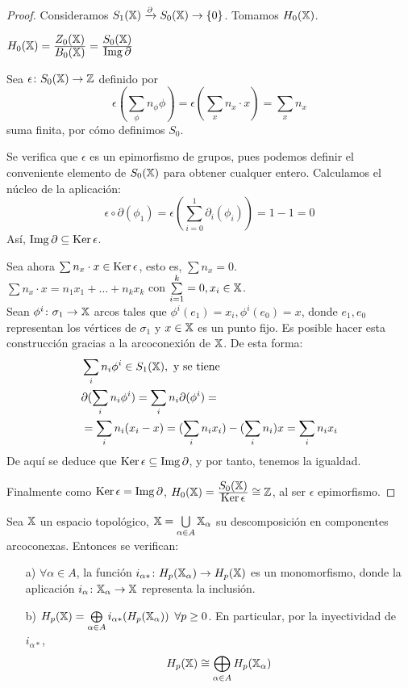 \begin{proof}
  Consideramos $S_{1}({\mathbb X}) \xrightarrow{\partial} S_{0}({\mathbb X}) \to \{0\}$. Tomamos $H_0({\mathbb X})$.

  $H_0({\mathbb X}) = \frac{\displaystyle Z_0({\mathbb X})}{\displaystyle B_0({\mathbb X})} = \frac{\displaystyle S_0({\mathbb X})}{\displaystyle \operatorname{Img} \partial}$

  Sea $\epsilon \colon S_0({\mathbb X}) \to \mathbb{Z}$ definido por \[\epsilon(\sum\limits_{\phi} n_\phi \phi) = \epsilon(\sum\limits_{x} n_x \cdot x) = \sum\limits_{x} n_x \]
  suma finita, por cómo definimos $S_0$.

  Se verifica que $\epsilon$ es un epimorfismo de grupos, pues podemos definir el conveniente elemento de $S_0({\mathbb X})$ para obtener
  cualquer entero. Calculamos el núcleo de la aplicación:
  \[ \epsilon \circ \partial(\phi_1) = \epsilon(\sum_{i=0}^1 \partial_i(\phi_i)) = 1 - 1 = 0\]  Así, $\operatorname{Img} \partial \subseteq \operatorname{Ker} \epsilon$.

  Sea ahora $\sum n_x \cdot x \in \operatorname{Ker} \epsilon$, esto es, $\sum n_x = 0$. \\
  $\sum n_x \cdot x = n_1 x_1 + \dots + n_k x_k$ con $\sum\limits_{i=1}^k = 0, x_i \in {\mathbb X}$. \\
  Sean $\phi^i \colon \sigma_1 \to {\mathbb X}$ arcos tales que $\phi^i(e_1) = x_i, \phi^i(e_0) = x$,
  donde $e_1, e_0$ representan los vértices de $\sigma_1$ y $x \in {\mathbb X}$ es un punto fijo.
  Es posible hacer esta construcción gracias a la arcoconexión de ${\mathbb X}$. De esta forma:
  \begin{align*}
    &\sum_i n_i \phi^i \in S_{1}({\mathbb X}), \text{ y se tiene} \\
    &\partial(\sum_i n_i \phi^i) = \sum_i n_i \partial(\phi^i) =\\
    &= \sum_i n_i(x_i - x) = (\sum_i n_i x_i) - (\sum_i n_i) x = \sum_i n_i x_i
  \end{align*}
  De aquí se deduce que $\operatorname{Ker} \epsilon \subseteq \operatorname{Img} \partial$, y por tanto, tenemos la igualdad.

  Finalmente como $\operatorname{Ker} \epsilon = \operatorname{Img} \partial$, $H_0({\mathbb X}) = \frac{\displaystyle S_0({\mathbb X})}{\displaystyle \operatorname{Ker} \epsilon} \cong \mathbb{Z}$, al ser $\epsilon$ epimorfismo.
\end{proof}

\begin{proposition}
  Sea ${\mathbb X}$ un espacio topológico, ${\mathbb X} = \bigcup\limits_{\alpha \in A} {\mathbb X}_\alpha$ su descomposición en componentes arcoconexas. Entonces se verifican:
  \begin{itemize}
    \item[a)] $\forall \alpha \in A$, la función $i_{\alpha*} \colon H_p({\mathbb X}_\alpha) \to H_p({\mathbb X})$ es un monomorfismo, donde la aplicación
              $i_\alpha \colon {\mathbb X}_\alpha \to {\mathbb X}$ representa la inclusión.
    \item[b)] $H_p({\mathbb X}) = \bigoplus\limits_{\alpha \in A} i_{\alpha*}(H_p({\mathbb X}_\alpha)) \hspace{0.5em} \forall p \geq 0$. En particular, por la inyectividad de $i_{\alpha*}$,
              \[ H_p({\mathbb X}) \cong \bigoplus_{\alpha \in A} H_p({\mathbb X}_\alpha) \]
  \end{itemize}
\end{proposition}

